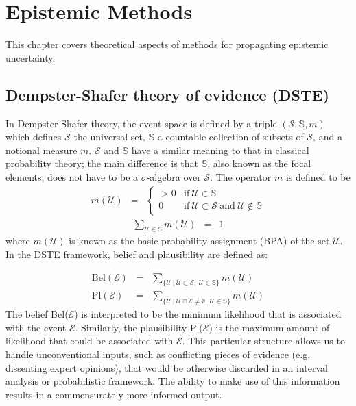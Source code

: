\chapter{Epistemic Methods}\label{uq:epist}


This chapter covers theoretical aspects of methods for propagating
epistemic uncertainty.

\section{Dempster-Shafer theory of evidence (DSTE)} \label{sec:epist_uq:dste}

In Dempster-Shafer theory, the event space is defined by a triple 
$(\mathcal{S},\mathbb{S},m)$ which defines $\mathcal{S}$ the universal set, 
$\mathbb{S}$ a countable collection of subsets of $\mathcal{S}$, and a 
notional measure $m$. $\mathcal{S}$ and $ \mathbb{S}$ have a similar meaning 
to that in classical probability theory; the main difference is that 
$\mathbb{S}$, also known as the focal elements, does not have to be a 
$\sigma$-algebra over $\mathcal{S}$. The operator $m$ is defined to be%
%
\begin{eqnarray}
m(\mathcal{U}) 
&=&  \left\{
\begin{array}{rr}
> 0 & \mathrm{if} \ \mathcal{U} \in \mathbb{S}\\
0 & \mathrm{if} \ \mathcal{U} \subset \mathcal{S} \ \mathrm{and} \ \mathcal{U} \notin \mathbb{S} 
\end{array} \right.
\end{eqnarray}%
\begin{eqnarray}
\displaystyle\sum_{\mathcal{U} \in \mathbb{S}} m(\mathcal{U}) &=& 1
\end{eqnarray}%
%
where $m(\mathcal{U})$ is known as the basic probability assignment (BPA) of 
the set $\mathcal{U}$. In the DSTE framework, belief and plausibility are 
defined as: 

\begin{eqnarray}
	\mathrm{Bel}(\mathcal{E}) &=& \displaystyle\sum_{\{ \mathcal{U} \ | \ \mathcal{U} \subset \mathcal{E}, \ \mathcal{U} \in \mathbb{S}\}} m(\mathcal{U}) \label{eq:bel}\\
	\mathrm{Pl}(\mathcal{E}) &=& \displaystyle\sum_{\{ \mathcal{U} \ | \ \mathcal{U} \cap \mathcal{E} \neq \emptyset, \ \mathcal{U} \in \mathbb{S}\}} m(\mathcal{U}) \label{eq:pl}
\end{eqnarray}%
%
The belief Bel($\mathcal{E}$) is interpreted to be the minimum likelihood 
that is associated with the event $\mathcal{E}$. Similarly, the plausibility 
Pl($\mathcal{E}$) is the maximum amount of likelihood that could be 
associated with $\mathcal{E}$. This particular structure allows us to handle 
unconventional inputs, such as conflicting pieces of evidence (e.g. 
dissenting expert opinions), that would be otherwise discarded in an interval 
analysis or probabilistic framework. The ability to make use of this 
information results in a commensurately more informed output.  

